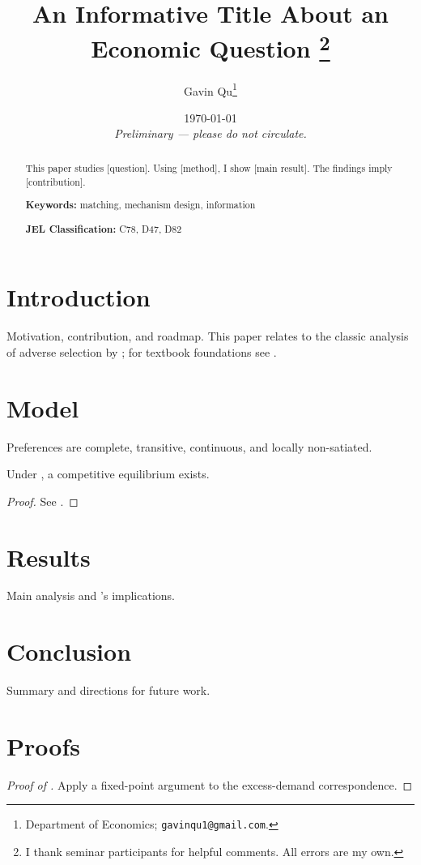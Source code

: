\documentclass[12pt]{article}
\title{\textbf{An Informative Title About an Economic Question}%
  \thanks{I thank seminar participants for helpful comments. All errors are my own.}}
\author{%
  Gavin Qu\thanks{Department of Economics; \texttt{gavinqu1@gmail.com}.}%
}
\date{\today \\[6pt] \small\emph{Preliminary --- please do not circulate.}}
\newcommand{\keywords}[1]{\par\smallskip\noindent\textbf{Keywords:} #1}
\newcommand{\jelcodes}[1]{\par\noindent\textbf{JEL Classification:} #1}
\begin{document}
\maketitle

\begin{abstract}\noindent
This paper studies [question]. Using [method], I show [main result]. The findings
imply [contribution]. \keywords{matching, mechanism design, information}
\jelcodes{C78, D47, D82}
\end{abstract}

\bigskip

\section{Introduction}\label{sec:intro}
Motivation, contribution, and roadmap. This paper relates to the classic analysis
of adverse selection by \textcite{akerlof1970}; for textbook foundations see
\textcite{mwg1995}.

\section{Model}\label{sec:model}
\begin{assumption}\label{as:reg}
Preferences are complete, transitive, continuous, and locally non-satiated.
\end{assumption}

\begin{proposition}\label{prop:exist}
Under , a competitive equilibrium exists.
\end{proposition}
\begin{proof}
See .
\end{proof}

\section{Results}\label{sec:results}
Main analysis and 's implications.

\section{Conclusion}\label{sec:conc}
Summary and directions for future work.

\printrefs

\appendix
\section{Proofs}\label{app:proofs}
\begin{proof}[Proof of ]
Apply a fixed-point argument to the excess-demand correspondence. \qedhere
\end{proof}
\end{document}
